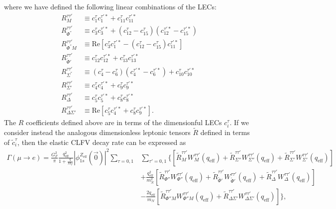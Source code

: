 \documentclass{book}[letterpaper,12pt]
\begin{document}
where we have defined the following linear combinations of the LECs:
\begin{equation}
\begin{split}
R_M^{\tau\tau'}&\equiv c_1^{\tau}c_1^{\tau'*}+c_{11}^{\tau}c_{11}^{\tau'*}\\
R_{\Phi^{''}}^{\tau\tau'}&\equiv c_3^{\tau}c_3^{\tau'*}+\left(c^{\tau}_{12}-c_{15}^{\tau}\right)\left(c_{12}^{\tau'*}-c_{15}^{\tau'*}\right)\\
R^{\tau\tau'}_{\Phi^{''}M}&\equiv \mathrm{Re}\left[c_3^{\tau}c_1^{\tau'*}-(c_{12}^{\tau}-c_{15}^{\tau})c_{11}^{\tau'*}\right]\\
R_{\tilde{\Phi}'}^{\tau\tau'}&\equiv c_{12}^{\tau}c_{12}^{\tau'*}+c_{13}^{\tau}c_{13}^{\tau'*}\\
R_{\Sigma^{''}}^{\tau\tau'}&\equiv (c_4^{\tau}-c_6^{\tau})(c_4^{\tau'*}-c_6^{\tau'*})+c_{10}^{\tau}c_{10}^{\tau'*}\\
R_{\Sigma'}^{\tau\tau'}&\equiv c_4^{\tau}c_4^{\tau'*}+c_9^{\tau}c_9^{\tau'*}\\
R_{\Delta}^{\tau\tau'}&\equiv c_5^{\tau}c_5^{\tau'*}+c_8^{\tau}c_8^{\tau'*}\\
R_{\Delta\Sigma'}^{\tau\tau'}&\equiv \mathrm{Re}\left[c_5^{\tau}c_4^{\tau'*}+c_8^{\tau}c_9^{\tau'*}\right].
\end{split}
\end{equation}
The $R$ coefficients defined above are in terms of the dimensionful LECs $c_i^{\tau}$. If we consider instead the analogous dimensionless leptonic tensors $\tilde{R}$ defined in terms of $\tilde{c}_i^{\tau}$, then the elastic CLFV decay rate can be expressed as 
\begin{equation}
\begin{split}
\Gamma\left(\mu\rightarrow e\right)=\frac{G_F^2}{\pi}\frac{q_\mathrm{eff}^2}{1+\frac{q}{M_T}}|\phi_{1s}^{Z_\mathrm{eff}}(\vec{0})|^2\sum_{\tau=0,1}&\sum_{\tau'=0,1}\Bigg\{\left[\tilde{R}_M^{\tau\tau'}W_M^{\tau\tau'}(q_\mathrm{eff})+\tilde{R}_{\Sigma''}^{\tau\tau'}W_{\Sigma''}^{\tau\tau'}(q_\mathrm{eff})+\tilde{R}_{\Sigma'}^{\tau\tau'}W_{\Sigma'}^{\tau\tau'}(q_\mathrm{eff})\right]\\
&+\frac{q_\mathrm{eff}^2}{m_N^2}\left[\tilde{R}_{\Phi''}^{\tau\tau'}W_{\Phi''}^{\tau\tau'}(q_\mathrm{eff})+\tilde{R}_{\tilde{\Phi}'}^{\tau\tau'}W_{\tilde{\Phi}'}^{\tau\tau'}(q_\mathrm{eff})+\tilde{R}_{\Delta}^{\tau\tau'}W_{\Delta}^{\tau\tau'}(q_\mathrm{eff})\right]\\
&-\frac{2q_\mathrm{eff}}{m_N}\left[\tilde{R}_{\Phi'' M}^{\tau\tau'}W_{\Phi'' M}^{\tau\tau'}(q_\mathrm{eff})+\tilde{R}_{\Delta\Sigma'}^{\tau\tau'}W_{\Delta\Sigma'}^{\tau\tau'}(q_\mathrm{eff})\right]\Bigg\},
\end{split}
\label{eq:mu2e_rate}
\end{equation}
\end{document}
